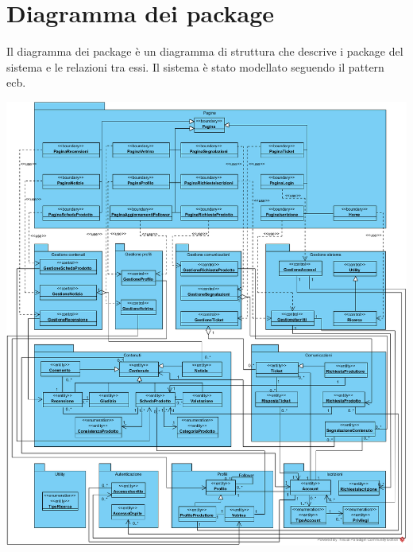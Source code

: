 \section{Diagramma dei package}  \label{cha:package}
Il diagramma dei package è un diagramma di struttura che descrive i package del sistema e le relazioni tra essi. Il sistema è stato modellato seguendo il pattern \gls{ecb}.
\begin{center}
			\includegraphics[width=\linewidth]{assets/visualParadigm/package/DiagrammaPacakage}
\end{center}

